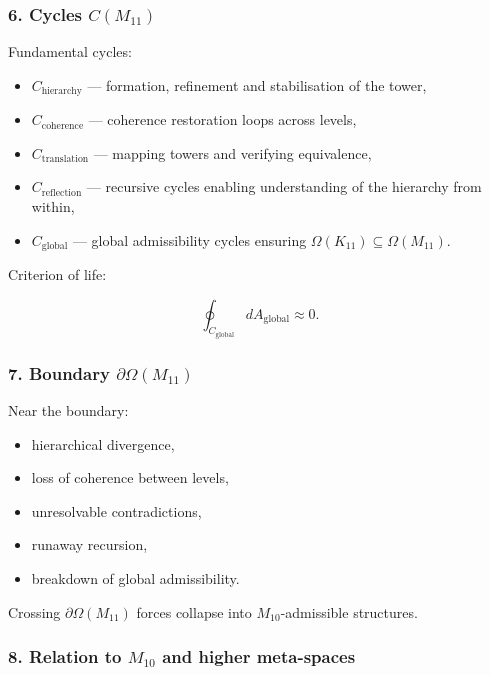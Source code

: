 \subsubsection*{6. Cycles $C(M_{11})$}

Fundamental cycles:

\begin{itemize}
    \item $C_{\mathrm{hierarchy}}$ — formation, refinement and stabilisation of the tower,
    \item $C_{\mathrm{coherence}}$ — coherence restoration loops across levels,
    \item $C_{\mathrm{translation}}$ — mapping towers and verifying equivalence,
    \item $C_{\mathrm{reflection}}$ — recursive cycles enabling
          understanding of the hierarchy from within,
    \item $C_{\mathrm{global}}$ — global admissibility cycles ensuring
          $\Omega(K_{11})\subseteq\Omega(M_{11})$.
\end{itemize}

Criterion of life:

\[
\oint_{C_{\mathrm{global}}} dA_{\mathrm{global}} \approx 0.
\]

\subsubsection*{7. Boundary $\partial\Omega(M_{11})$}

Near the boundary:

\begin{itemize}
    \item hierarchical divergence,
    \item loss of coherence between levels,
    \item unresolvable contradictions,
    \item runaway recursion,
    \item breakdown of global admissibility.
\end{itemize}

Crossing $\partial\Omega(M_{11})$ forces collapse into $M_{10}$-admissible structures.

\subsubsection*{8. Relation to $M_{10}$ and higher meta-spaces}

